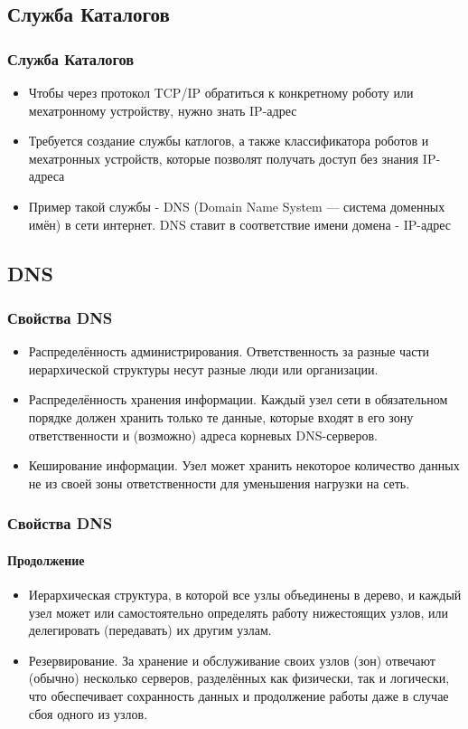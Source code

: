 \documentclass{beamer}
\begin{document}
\subsection{Служба Каталогов}
\begin{frame}
\frametitle{Служба Каталогов}
\begin{itemize}  
\item<1>Чтобы через протокол TCP/IP обратиться к конкретному роботу или
мехатронному устройству, нужно знать IP-адрес
\item<1>Требуется создание службы катлогов, а также классификатора роботов и
мехатронных устройств, которые позволят получать доступ без знания IP-адреса
\item<1>Пример такой службы - DNS (Domain Name System — система доменных имён)
в сети интернет. DNS ставит в соответствие имени домена - IP-адрес
\end{itemize}
\end{frame}

\subsection{DNS}
\begin{frame}
\frametitle{Свойства DNS}
\begin{itemize}
\item<1>Распределённость администрирования. Ответственность за разные части
иерархической структуры несут разные люди или организации.
\item<1>Распределённость хранения информации. Каждый узел сети в обязательном
порядке должен хранить только те данные, которые входят в его зону ответственности и (возможно) адреса 
корневых DNS-серверов.
\item<1>Кеширование информации. Узел может хранить некоторое количество данных
не из своей зоны ответственности для уменьшения нагрузки на сеть.
\end{itemize}
\end{frame}

\begin{frame}
\frametitle{Свойства DNS}
\framesubtitle{Продолжение}
\begin{itemize}
\item<1>Иерархическая структура, в которой все узлы объединены в дерево, и
каждый узел может или самостоятельно определять работу нижестоящих узлов, или делегировать (передавать) 
их другим узлам.
\item<1>Резервирование. За хранение и обслуживание своих узлов (зон) отвечают
(обычно) несколько серверов, разделённых как физически, так и логически, что
обеспечивает сохранность данных и продолжение работы даже в случае сбоя одного из узлов.
\end{itemize}
\end{frame}
\end{document}
